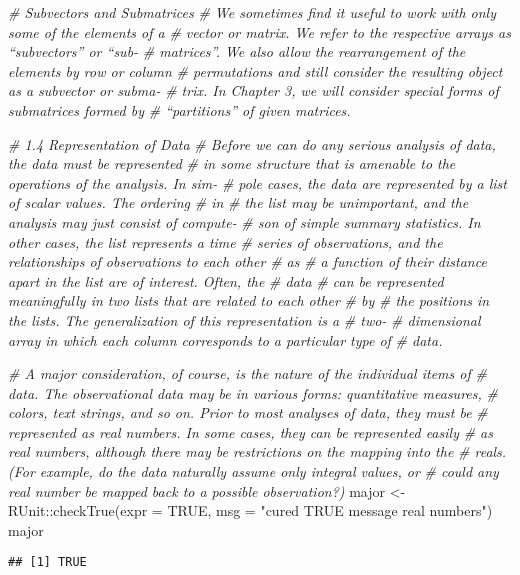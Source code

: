 \documentclass[
]{article}
\newenvironment{Shaded}{\begin{snugshade}}{\end{snugshade}}
\newcommand{\AttributeTok}[1]{\textcolor[rgb]{0.77,0.63,0.00}{#1}}
\newcommand{\CommentTok}[1]{\textcolor[rgb]{0.56,0.35,0.01}{\textit{#1}}}
\newcommand{\ConstantTok}[1]{\textcolor[rgb]{0.00,0.00,0.00}{#1}}
\newcommand{\FunctionTok}[1]{\textcolor[rgb]{0.00,0.00,0.00}{#1}}
\newcommand{\NormalTok}[1]{#1}
\newcommand{\OtherTok}[1]{\textcolor[rgb]{0.56,0.35,0.01}{#1}}
\newcommand{\SpecialCharTok}[1]{\textcolor[rgb]{0.00,0.00,0.00}{#1}}
\newcommand{\StringTok}[1]{\textcolor[rgb]{0.31,0.60,0.02}{#1}}
\begin{document}
\begin{Shaded}
\begin{Highlighting}[]
\CommentTok{\# Subvectors and Submatrices}
\CommentTok{\# We sometimes ﬁnd it useful to work with only some of the elements of a}
\CommentTok{\# vector or matrix. We refer to the respective arrays as “subvectors” or “sub{-}}
\CommentTok{\# matrices”. We also allow the rearrangement of the elements by row or column}
\CommentTok{\# permutations and still consider the resulting object as a subvector or subma{-}}
\CommentTok{\# trix. In Chapter 3, we will consider special forms of submatrices formed by}
\CommentTok{\# “partitions” of given matrices.}

\CommentTok{\# 1.4 Representation of Data}
\CommentTok{\# Before we can do any serious analysis of data, the data must be represented}
\CommentTok{\# in some structure that is amenable to the operations of the analysis. In sim{-}}
\CommentTok{\# pole cases, the data are represented by a list of scalar values. The ordering }
\CommentTok{\# in}
\CommentTok{\# the list may be unimportant, and the analysis may just consist of compute{-}}
\CommentTok{\# son of simple summary statistics. In other cases, the list represents a time}
\CommentTok{\# series of observations, and the relationships of observations to each other }
\CommentTok{\# as}
\CommentTok{\# a function of their distance apart in the list are of interest. Often, the }
\CommentTok{\# data}
\CommentTok{\# can be represented meaningfully in two lists that are related to each other }
\CommentTok{\# by}
\CommentTok{\# the positions in the lists. The generalization of this representation is a }
\CommentTok{\# two{-}}
\CommentTok{\# dimensional array in which each column corresponds to a particular type of}
\CommentTok{\# data.}

\CommentTok{\# A major consideration, of course, is the nature of the individual items of}
\CommentTok{\# data. The observational data may be in various forms: quantitative measures,}
\CommentTok{\# colors, text strings, and so on. Prior to most analyses of data, they must be}
\CommentTok{\# represented as real numbers. In some cases, they can be represented easily}
\CommentTok{\# as real numbers, although there may be restrictions on the mapping into the}
\CommentTok{\# reals. (For example, do the data naturally assume only integral values, or}
\CommentTok{\# could any real number be mapped back to a possible observation?)}
\NormalTok{major }\OtherTok{\textless{}{-}}\NormalTok{ RUnit}\SpecialCharTok{::}\FunctionTok{checkTrue}\NormalTok{(}\AttributeTok{expr =} \ConstantTok{TRUE}\NormalTok{, }\AttributeTok{msg =} \StringTok{"cured TRUE message real numbers"}\NormalTok{)}
\NormalTok{major}
\end{Highlighting}
\end{Shaded}

\begin{verbatim}
## [1] TRUE
\end{verbatim}
\end{document}
